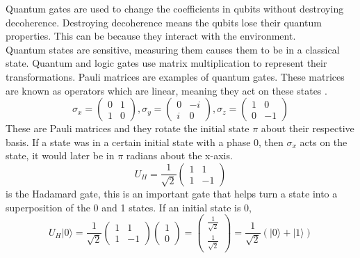 \documentclass{Assignment}
\begin{document}
Quantum gates are used to change the coefficients in qubits without destroying decoherence.
Destroying decoherence means the qubits lose their quantum properties.
This can be because they interact with the environment.\\
Quantum states are sensitive, measuring them causes them to be in a classical state.
Quantum and logic gates use matrix multiplication to represent their transformations.
Pauli matrices are examples of quantum gates.
These matrices are known as operators which are linear, meaning they act on these states \cite{AndrewSteane,mcintyre_quantum_2012}.
\begin{equation}
	\sigma_x =\begin{pmatrix}
		0&1\\1&0
	\end{pmatrix},
	\sigma_y =\begin{pmatrix}
		0&-i\\i&0
	\end{pmatrix},\sigma_z =\begin{pmatrix}
		1&0\\0&-1
	\end{pmatrix}
\end{equation}
These are Pauli matrices and they rotate the initial state $\pi$ about their respective basis.
If a state was in a certain initial state with a phase 0, then $\sigma_x$ acts on the state, it would later be in $\pi$ radians about the x-axis.
\begin{equation}U_H=\frac{1}{\sqrt{2}}
	\begin{pmatrix}
		1&1\\1&-1
	\end{pmatrix}
\end{equation} is the Hadamard gate, this is an important gate that helps turn a state into a superposition of the 0 and 1 states.
If an initial state is 0, 
\begin{equation}
	U_H|0\rangle = \frac{1}{\sqrt{2}}
	\begin{pmatrix}
		1&1\\1&-1
	\end{pmatrix}\begin{pmatrix}
		1\\0
	\end{pmatrix}=\begin{pmatrix}
		\frac{1}{\sqrt{2}}\\
		\frac{1}{\sqrt{2}}
	\end{pmatrix}=\frac{1}{\sqrt{2}}(|0 \rangle + |1\rangle)
\end{equation} 
\end{document}
